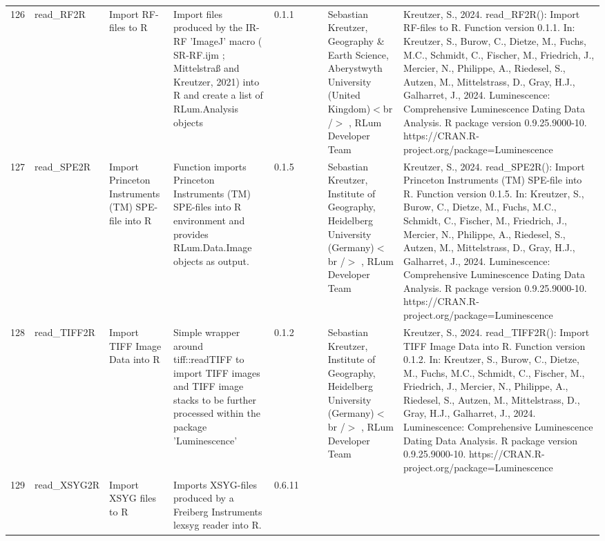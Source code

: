 \begin{table}[ht]
\begin{tabular}{rllllllll}
 \\ 
  126 & read\_RF2R & Import RF-files to R & Import files produced by the IR-RF 'ImageJ' macro ( SR-RF.ijm ; Mittelstraß and Kreutzer, 2021) into R and create a list of  RLum.Analysis  objects & 0.1.1
 &  &  & Sebastian Kreutzer, Geography \& Earth Science, Aberystwyth University (United Kingdom)$<$br /$>$ , RLum Developer Team & Kreutzer, S., 2024. read\_RF2R(): Import RF-files to R. Function version 0.1.1. In: Kreutzer, S., Burow, C., Dietze, M., Fuchs, M.C., Schmidt, C., Fischer, M., Friedrich, J., Mercier, N., Philippe, A., Riedesel, S., Autzen, M., Mittelstrass, D., Gray, H.J., Galharret, J., 2024. Luminescence: Comprehensive Luminescence Dating Data Analysis. R package version 0.9.25.9000-10. https://CRAN.R-project.org/package=Luminescence
 \\ 
  127 & read\_SPE2R & Import Princeton Instruments (TM) SPE-file into R & Function imports Princeton Instruments (TM) SPE-files into R environment and provides  RLum.Data.Image  objects as output. & 0.1.5
 &  &  & Sebastian Kreutzer, Institute of Geography, Heidelberg University (Germany)$<$br /$>$ , RLum Developer Team & Kreutzer, S., 2024. read\_SPE2R(): Import Princeton Instruments (TM) SPE-file into R. Function version 0.1.5. In: Kreutzer, S., Burow, C., Dietze, M., Fuchs, M.C., Schmidt, C., Fischer, M., Friedrich, J., Mercier, N., Philippe, A., Riedesel, S., Autzen, M., Mittelstrass, D., Gray, H.J., Galharret, J., 2024. Luminescence: Comprehensive Luminescence Dating Data Analysis. R package version 0.9.25.9000-10. https://CRAN.R-project.org/package=Luminescence
 \\ 
  128 & read\_TIFF2R & Import TIFF Image Data into R & Simple wrapper around  tiff::readTIFF  to import TIFF images and TIFF image stacks to be further processed within the package  'Luminescence' & 0.1.2
 &  &  & Sebastian Kreutzer, Institute of Geography, Heidelberg University (Germany)$<$br /$>$ , RLum Developer Team & Kreutzer, S., 2024. read\_TIFF2R(): Import TIFF Image Data into R. Function version 0.1.2. In: Kreutzer, S., Burow, C., Dietze, M., Fuchs, M.C., Schmidt, C., Fischer, M., Friedrich, J., Mercier, N., Philippe, A., Riedesel, S., Autzen, M., Mittelstrass, D., Gray, H.J., Galharret, J., 2024. Luminescence: Comprehensive Luminescence Dating Data Analysis. R package version 0.9.25.9000-10. https://CRAN.R-project.org/package=Luminescence
 \\ 
  129 & read\_XSYG2R & Import XSYG files to R & Imports XSYG-files produced by a Freiberg Instruments lexsyg reader into R. & 0.6.11

\end{tabular}
\end{table}
